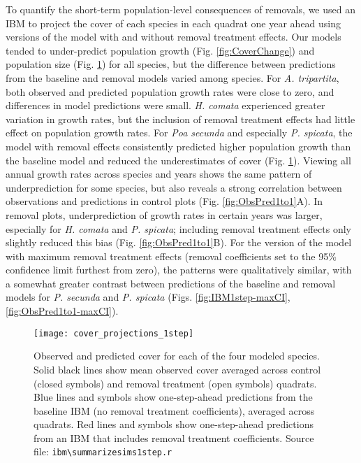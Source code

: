 \documentclass[11pt]{article}
\begin{document}
\begin{doublespacing}
To quantify the short-term population-level consequences of removals, we used an IBM to project the cover of each species in each quadrat one year ahead using versions of the model with and without removal treatment effects. Our models tended to under-predict population growth (Fig. \ref{fig:CoverChange}) and population size (Fig. \ref{fig:IBM1step}) for all species, but the difference between predictions from the baseline and removal models varied among species. For \textit{A. tripartita}, both observed and predicted population growth rates were close to zero, and differences in model predictions were small. \textit{H. comata} experienced greater variation in growth rates, but the inclusion of removal treatment effects had little effect on population growth rates. For \textit{Poa secunda} and especially \textit{P. spicata}, the model with removal effects consistently predicted higher population growth than the baseline model  and reduced the underestimates of cover (Fig. \ref{fig:IBM1step}). Viewing all annual growth rates across species and years shows the same pattern of underprediction for some species, but also reveals a strong correlation between observations and predictions in control plots (Fig. \ref{fig:ObsPred1to1}A). In removal plots, underprediction of growth rates in certain years was larger, especially for \textit{H. comata} and \textit{P. spicata}; including removal treatment effects only slightly reduced this bias (Fig. \ref{fig:ObsPred1to1}B). For the version of the model with maximum removal treatment effects (removal coefficients set to the 95\% confidence limit furthest from zero), the patterns were qualitatively similar, with a somewhat greater contrast between predictions of the baseline and removal models for \textit{P. secunda} and \textit{P. spicata} (Figs. \ref{fig:IBM1step-maxCI},\ref{fig:ObsPred1to1-maxCI}).

 \begin{figure}[tbp]
 \centering
 \texttt{[image: cover\_projections\_1step]}
 \caption{Observed and predicted cover for each of the four modeled species. Solid black lines show mean observed cover averaged across control (closed symbols) and removal treatment (open symbols) quadrats. Blue lines and symbols show one-step-ahead predictions from the baseline IBM (no removal treatment coefficients), averaged across quadrats. Red lines and symbols show one-step-ahead predictions from an IBM that includes removal treatment coefficients. Source file: \texttt{ibm\textbackslash summarize\textunderscore sims1step.r} }
 \label{fig:IBM1step}
 \end{figure}
 

\end{doublespacing}
\end{document}
